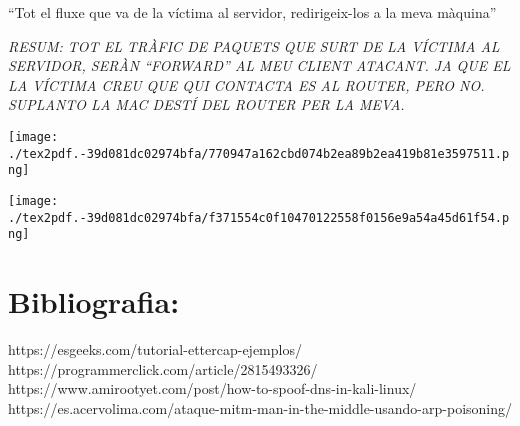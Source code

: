 \documentclass[]{article}
\begin{document}
``Tot el fluxe que va de la víctima al servidor, redirigeix-los a la
meva màquina''

\emph{RESUM: TOT EL TRÀFIC DE PAQUETS QUE SURT DE LA VÍCTIMA AL
SERVIDOR, SERÀN ``FORWARD'' AL MEU CLIENT ATACANT. JA QUE EL LA VÍCTIMA
CREU QUE QUI CONTACTA ES AL ROUTER, PERO NO. SUPLANTO LA MAC DESTÍ DEL
ROUTER PER LA MEVA.}

\texttt{[image: ./tex2pdf.-39d081dc02974bfa/770947a162cbd074b2ea89b2ea419b81e3597511.png]}

\texttt{[image: ./tex2pdf.-39d081dc02974bfa/f371554c0f10470122558f0156e9a54a45d61f54.png]}

\hypertarget{bibliografia}{%
\section{\texorpdfstring{\textbf{Bibliografia}:}{Bibliografia:}}\label{bibliografia}}

https://esgeeks.com/tutorial-ettercap-ejemplos/
https://programmerclick.com/article/2815493326/
https://www.amirootyet.com/post/how-to-spoof-dns-in-kali-linux/
https://es.acervolima.com/ataque-mitm-man-in-the-middle-usando-arp-poisoning/
\end{document}
